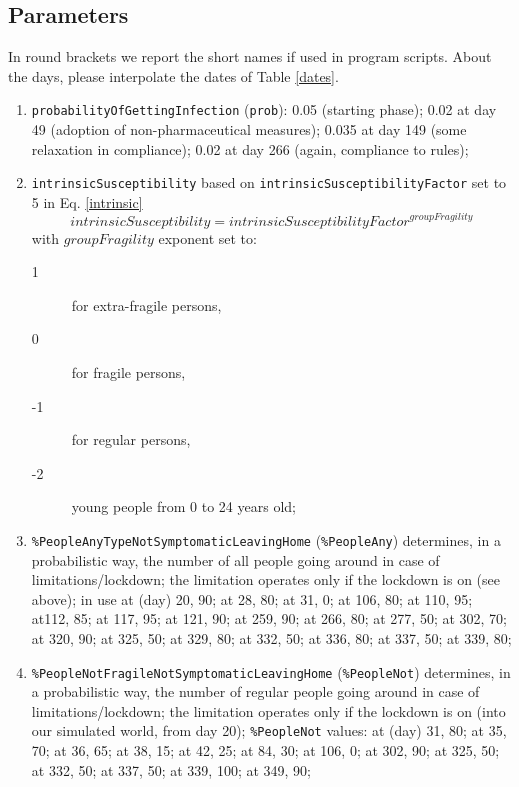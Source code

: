 \documentclass[graybox]{svmult}
\begin{document}
\subsection{Parameters}\label{par}

In round brackets we report the short names if used in program scripts. About the days, please interpolate the dates of Table \ref{dates}.

\begin{enumerate}[label=\roman*]

\item \label{p1} \verb|probabilityOfGettingInfection| (\verb|prob|): 0.05 (starting phase); 0.02 at day 49 (adoption of non-pharmaceutical measures); 0.035 at day 149 (some relaxation in compliance); 0.02 at day 266 (again, compliance to rules);  

\item \label{p2} \verb|intrinsicSusceptibility| based on \verb!intrinsicSusceptibilityFactor! set to 5 in Eq. \ref{intrinsic}
\begin{equation}
intrinsicSusceptibility = intrinsicSusceptibilityFactor^{groupFragility}
\label{intrinsic}
\end{equation}
with $groupFragility$ exponent set to:

\begin{description}
\item [1] for extra-fragile persons,
\item [0] for fragile persons,
\item [-1] for regular persons,
\item [-2] young people from 0 to 24 years old;
\end{description}

\item \label{p3} \verb|%PeopleAnyTypeNotSymptomaticLeavingHome| (\verb|%PeopleAny|)
determines, in a probabilistic way, the number of all people going around in case of limitations/lockdown; 
the limitation operates only if the lockdown is on (see above); in use
at (day) 20, 90; at 28, 80; at 31, 0; at 106, 80; at 110, 95; at112, 85; at 117, 95; at 121, 90; at 259, 90; at 266, 80; at 277, 50;
at 302, 70; at 320, 90; at 325, 50; at 329, 80; at 332, 50; at 336, 80; at 337, 50; at 339, 80; 

\item \label{p4} \verb|%PeopleNotFragileNotSymptomaticLeavingHome| (\verb|%PeopleNot|)
determines, in a probabilistic way, the number of regular people going around in case of limitations/lockdown;
the limitation operates only if the lockdown is on (into our simulated world, from day 20); \verb|%PeopleNot| values: 
at (day) 31, 80; at 35, 70; at 36, 65; at 38, 15; at 42, 25; at 84, 30; at 106, 0; at 302, 90; at 325, 50; at 332, 50; 
at 337, 50; at 339, 100; at 349, 90;


\end{enumerate}
\end{document}
